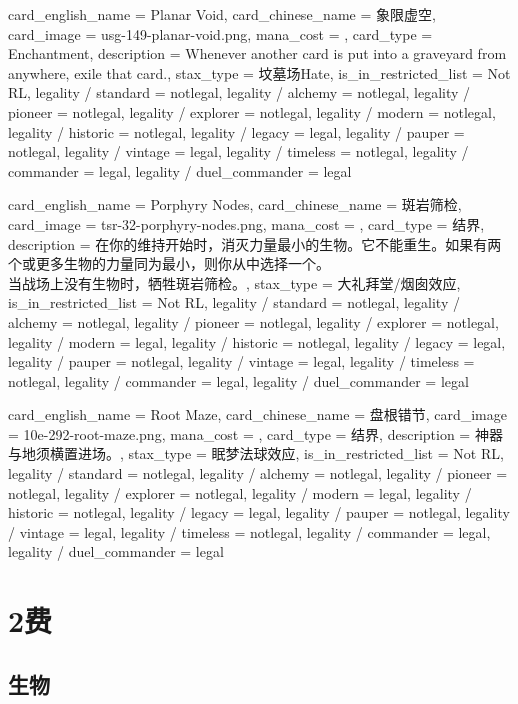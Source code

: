 \documentclass[lang = cn, color = black, 10pt]{AllThatStax}
\begin{document}
\card
{
	card_english_name = {Planar Void},
	card_chinese_name = {象限虚空},
	card_image = usg-149-planar-void.png,
	mana_cost = ,
	card_type = Enchantment,
	description = {Whenever another card is put into a graveyard from anywhere, exile that card.},
	stax_type = 坟墓场Hate,
	is_in_restricted_list = Not RL,
	legality / standard = notlegal,
	legality / alchemy = notlegal,
	legality / pioneer = notlegal,
	legality / explorer = notlegal,
	legality / modern = notlegal,
	legality / historic = notlegal,
	legality / legacy = legal,
	legality / pauper = notlegal,
	legality / vintage = legal,
	legality / timeless = notlegal,
	legality / commander = legal,
	legality / duel_commander = legal
}

\card
{
	card_english_name = {Porphyry Nodes},
	card_chinese_name = {斑岩筛检},
	card_image = tsr-32-porphyry-nodes.png,
	mana_cost = ,
	card_type = 结界,
	description = {在你的维持开始时，消灭力量最小的生物。它不能重生。如果有两个或更多生物的力量同为最小，则你从中选择一个。\\
		当战场上没有生物时，牺牲斑岩筛检。},
	stax_type = 大礼拜堂/烟囱效应,
	is_in_restricted_list = Not RL,
	legality / standard = notlegal,
	legality / alchemy = notlegal,
	legality / pioneer = notlegal,
	legality / explorer = notlegal,
	legality / modern = legal,
	legality / historic = notlegal,
	legality / legacy = legal,
	legality / pauper = notlegal,
	legality / vintage = legal,
	legality / timeless = notlegal,
	legality / commander = legal,
	legality / duel_commander = legal
}

\card
{
	card_english_name = {Root Maze},
	card_chinese_name = {盘根错节},
	card_image = 10e-292-root-maze.png,
	mana_cost = ,
	card_type = 结界,
	description = {神器与地须横置进场。},
	stax_type = 眠梦法球效应,
	is_in_restricted_list = Not RL,
	legality / standard = notlegal,
	legality / alchemy = notlegal,
	legality / pioneer = notlegal,
	legality / explorer = notlegal,
	legality / modern = legal,
	legality / historic = notlegal,
	legality / legacy = legal,
	legality / pauper = notlegal,
	legality / vintage = legal,
	legality / timeless = notlegal,
	legality / commander = legal,
	legality / duel_commander = legal
}

\chapter{2费}

\section{生物}
\end{document}
